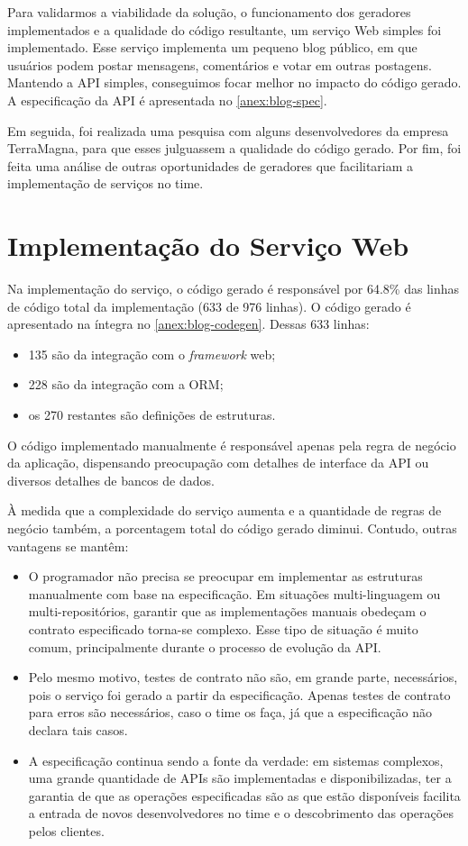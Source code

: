 Para validarmos a viabilidade da solução, o funcionamento dos geradores implementados e
a qualidade do código resultante, um serviço Web simples foi implementado. Esse serviço
implementa um pequeno blog público, em que usuários podem postar mensagens, comentários
e votar em outras postagens. Mantendo a API simples, conseguimos focar melhor no impacto
do código gerado. A especificação da API é apresentada no \cref{anex:blog-spec}.

Em seguida, foi realizada uma pesquisa com alguns desenvolvedores da empresa TerraMagna,
para que esses julguassem a qualidade do código gerado. Por fim, foi feita uma análise de
outras oportunidades de geradores que facilitariam a implementação de serviços no time.

\section{Implementação do Serviço Web}

Na implementação do serviço, o código gerado é responsável por 64.8\% das linhas de código
total da implementação (633 de 976 linhas). O código gerado é apresentado na íntegra no
\cref{anex:blog-codegen}. Dessas 633 linhas:

\begin{itemize}
\item 135 são da integração com o \textit{framework} web;
\item 228 são da integração com a ORM;
\item os 270 restantes são definições de estruturas.
\end{itemize}

O código implementado manualmente é responsável apenas pela regra de negócio da aplicação,
dispensando preocupação com detalhes de interface da API ou diversos detalhes de bancos
de dados.

À medida que a complexidade do serviço aumenta e a quantidade de regras de negócio também,
a porcentagem total do código gerado diminui. Contudo, outras vantagens se mantêm:

\begin{itemize}
\item O programador não precisa se preocupar em implementar as estruturas manualmente com
  base na especificação. Em situações multi-linguagem ou multi-repositórios, garantir que
  as implementações manuais obedeçam o contrato especificado torna-se complexo. Esse tipo
  de situação é muito comum, principalmente durante o processo de evolução da API.
\item Pelo mesmo motivo, testes de contrato não são, em grande parte, necessários, pois o
  serviço foi gerado a partir da especificação. Apenas testes de contrato para erros são
  necessários, caso o time os faça, já que a especificação não declara tais casos.
\item A especificação continua sendo a fonte da verdade: em sistemas complexos, uma grande
  quantidade de APIs são implementadas e disponibilizadas, ter a garantia de que as operações
  especificadas são as que estão disponíveis facilita a entrada de novos desenvolvedores no
  time e o descobrimento das operações pelos clientes.
\end{itemize}


